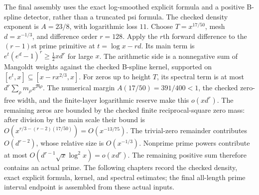 The final assembly uses the exact log-smoothed explicit formula and a
positive B-spline detector, rather than a truncated psi formula.
The checked density exponent is $A=23/8$, with logarithmic loss $11$.
Choose $T=x^{17/50}$, mesh $d=x^{-1/3}$, and difference order $r=128$.
Apply the $r$th forward difference to the $(r-1)$st prime primitive
at $t=\log x-rd$.
Its main term is $e^t(e^d-1)^r\ge\tfrac12xd^r$ for large $x$.
The arithmetic side is a nonnegative sum of Mangoldt weights against
the checked B-spline kernel, supported on
$[e^t,x]\subseteq[x-rx^{2/3},x]$.
For zeros up to height $T$, its spectral term is at most
$d^r\sum_\rho m_\rho x^{\Re\rho}$.
The numerical margin $A(17/50)=391/400<1$, the checked zero-free width,
and the finite-layer logarithmic reserve make this $o(xd^r)$.
The remaining zeros are bounded by the checked finite reciprocal-square
zero mass: after division by the main scale their bound is
$O(x^{r/3-(r-2)(17/50)})=O(x^{-13/75})$.
The trivial-zero remainder contributes $O(d^{r-2})$, whose relative
size is $O(x^{-1/3})$.
Nonprime prime powers contribute at most
$O(d^{r-1}\sqrt x\log^2x)=o(xd^r)$.
The remaining positive sum therefore contains an actual prime.
The following chapters record the checked density, exact explicit
formula, kernel, and spectral estimates; the final all-length prime
interval endpoint is assembled from these actual inputs.

